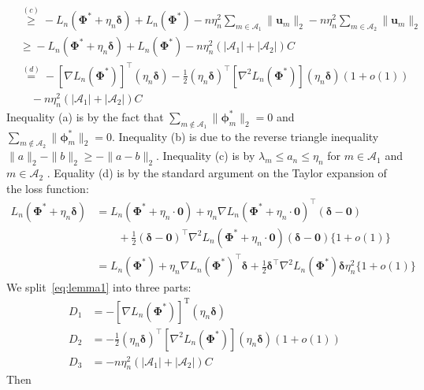 \documentclass[a4paper,fleqn]{cas-sc}
\newcommand{\bdelta}{\boldsymbol{\delta}}
\newcommand{\A}{\mathcal{A}}
\begin{document}
{\begin{align}
	& \overset{(c)}{\geq}-L_{n}(\boldsymbol{\Phi}^{*}+\eta_{n}\bdelta)+L_{n}(\boldsymbol{\Phi}^{*})-n\eta_{n}^{2}\sum_{m\in\mathcal{A}_{1}}\|\mathbf{u}_{m}\|_{2}-n\eta_{n}^{2}\sum_{m\in\mathcal{A}_{2}}\|\mathbf{u}_{m}\|_{2}\nonumber \\
	& \overset{}{\geq}-L_{n}(\boldsymbol{\Phi}^{*}+\eta_{n}\bdelta)+L_{n}(\boldsymbol{\Phi}^{*})-n\eta_{n}^{2}(|\A_{1}|+|\A_{2}|)C\nonumber \\
	& \overset{(d)}{=}-[\nabla L_{n}(\boldsymbol{\Phi}^{*})]^{\top}(\eta_{n}\bdelta)-\frac{1}{2}(\eta_{n}\bdelta)^{\top}[\nabla^{2}L_{n}(\boldsymbol{\Phi}^{*})](\eta_{n}\bdelta)(1+o(1))\nonumber \\
	& \quad-n\eta_{n}^{2}(|\A_{1}|+|\A_{2}|)C\label{eq:lemma1}
	\end{align}
	Inequality (a) is by the fact that $\sum_{m\notin\mathcal{A}_{1}}\|\boldsymbol{\phi}_{m}^{*}\|_{2}=0$
	and $\sum_{m\notin\mathcal{A}_{2}}\|\boldsymbol{\phi}_{m}^{*}\|_{2}=0$.
	Inequality (b) is due to the reverse triangle inequality $\|a\|_{2}-\|b\|_{2}\geq-\|a-b\|_{2}$.
	Inequality (c) is by $\lambda_{m}\leq a_{n}\leq\eta_{n}$ for $m\in\A_{1}$
	and $m\in\A_{2}$ . Equality (d) is by the standard argument on the
	Taylor expansion of the loss function: 
	\begin{align*}
	L_{n}(\boldsymbol{\Phi}^{*}+\eta_{n}\bdelta) & =L_{n}(\boldsymbol{\Phi}^{*}+\eta_{n}\cdot\mathbf{0})+\eta_{n}\nabla L_{n}(\boldsymbol{\Phi}^{*}+\eta_{n}\cdot\mathbf{0})^{\top}(\bdelta-\mathbf{0})\\
	& \qquad+\frac{1}{2}(\bdelta-\mathbf{0})^{\top}\nabla^{2}L_{n}(\boldsymbol{\Phi}^{*}+\eta_{n}\cdot\mathbf{0})(\bdelta-\mathbf{0})\{1+o(1)\}\\
	& =L_{n}(\boldsymbol{\Phi}^{*})+\eta_{n}\nabla L_{n}(\boldsymbol{\Phi}^{*})^{\top}\bdelta+\frac{1}{2}\bdelta^{\top}\nabla^{2}L_{n}(\boldsymbol{\Phi}^{*})\bdelta\eta_{n}^{2}\{1+o(1)\}
	\end{align*}
	We split~\eqref{eq:lemma1} into three parts: 
	\[
	\begin{aligned}D_{1} & =-\left[\nabla L_{n}\left(\boldsymbol{\Phi}^{*}\right)\right]^{\mathrm{T}}\left(\eta_{n}\boldsymbol{\delta}\right)\\
	D_{2} & =-\frac{1}{2}\left(\eta_{n}\boldsymbol{\delta}\right)^{\top}\left[\nabla^{2}L_{n}\left(\boldsymbol{\Phi}^{*}\right)\right]\left(\eta_{n}\boldsymbol{\delta}\right)\left(1+o(1)\right)\\
	D_{3} & =-n\eta_{n}^{2}(|\A_{1}|+|\A_{2}|)C
	\end{aligned}
	\]
	Then
	\begin{align}

\end{align}}
\end{document}
